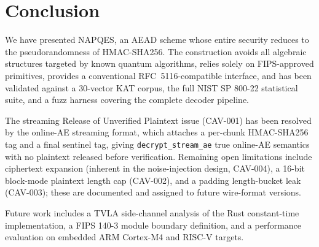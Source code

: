 \documentclass[11pt,a4paper]{article}
\begin{document}
\section{Conclusion}
\label{sec:conclusion}

We have presented NAPQES, an AEAD scheme whose entire security reduces to the
pseudorandomness of HMAC-SHA256.  The construction avoids all algebraic
structures targeted by known quantum algorithms, relies solely on FIPS-approved
primitives, provides a conventional RFC~5116-compatible interface, and has been
validated against a 30-vector KAT corpus, the full NIST SP 800-22 statistical
suite, and a fuzz harness covering the complete decoder pipeline.

The streaming Release of Unverified Plaintext issue (CAV-001) has been
resolved by the online-AE streaming format, which attaches a per-chunk
HMAC-SHA256 tag and a final sentinel tag, giving \texttt{decrypt\_stream\_ae}
true online-AE semantics with no plaintext released before verification.
Remaining open limitations include ciphertext expansion (inherent in the
noise-injection design, CAV-004), a 16-bit block-mode plaintext length cap
(CAV-002), and a padding length-bucket leak (CAV-003); these are documented
and assigned to future wire-format versions.

Future work includes a TVLA side-channel analysis of the Rust constant-time
implementation, a FIPS 140-3 module boundary definition, and a performance
evaluation on embedded ARM Cortex-M4 and RISC-V targets.
\end{document}
